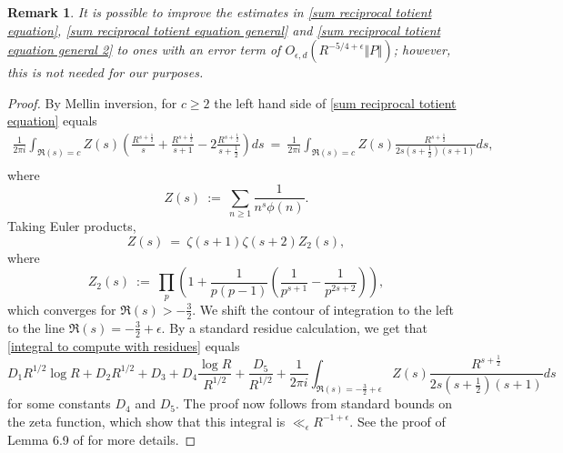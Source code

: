 \documentclass[12pt,reqno]{amsart}
\numberwithin{equation}{section}
\theoremstyle{plain}
\newtheorem{remark}[thm]{Remark}
\begin{document}
\begin{remark}  It is possible to improve the estimates in \eqref{sum reciprocal totient equation}, \eqref{sum reciprocal totient equation general} and \eqref{sum reciprocal totient equation general 2} to ones with an error term of $O_{\epsilon,d}(R^{-5/4+\epsilon}\Vert P\Vert)$; however, this is not needed for our purposes.
\end{remark}

\begin{proof}
 By Mellin inversion, for $c\geq 2$ the left hand side of \eqref{sum reciprocal totient equation} equals
\begin{eqnarray} \frac 1{2\pi i} \int_{\Re (s)=c} Z(s) \left( \frac{R^{s+\frac 12}}{s}+\frac{R^{s+\frac 12}}{s+1}-2\frac{R^{s+\frac 12}}{s+\frac 12} \right)  ds  \ = \ \frac 1{2\pi i} \int_{\Re (s)=c} Z(s) \frac{R^{s+\frac 12}}{2s(s+\frac 12)(s+1)} ds, \nonumber\\
\label{integral to compute with residues}
\end{eqnarray}
where \begin{equation} Z(s) \ :=\ \sum_{n\geq 1} \frac 1{n^s \phi(n)}.\end{equation}
Taking Euler products,
\begin{equation} Z(s) \ = \ \zeta(s+1)\zeta(s+2)Z_2(s),\end{equation}
where
\begin{equation} Z_2(s) \ :=\ \prod_p \left( 1+\frac 1{p(p-1)}\left(\frac 1{p^{s+1}}-\frac 1{p^{2s+2}} \right)\right),\end{equation}
which converges for $\Re (s)>-\frac 32$. We shift the contour of integration to the left to the line $\Re (s)=-\frac 32+\epsilon$. By a standard residue calculation, we get that \eqref{integral to compute with residues} equals
 \begin{equation} D_1R^{1/2} \log R + D_2 R^{1/2} + D_3 + D_4\frac{\log R}{R^{1/2}} + \frac{D_5}{R^{1/2}}+\frac 1{2\pi i} \int_{\Re (s)=-\frac 32+\epsilon} Z(s) \frac{R^{s+\frac 12}}{2s(s+\frac 12)(s+1)} ds\end{equation}
for some constants $D_4$ and $D_5$. The proof now follows from standard bounds on the zeta function, which show that this integral is $\ll_{\epsilon} R^{-1+\epsilon}$. See the proof of Lemma 6.9 of \cite{fiorilli} for more details.


\end{proof}
\end{document}
